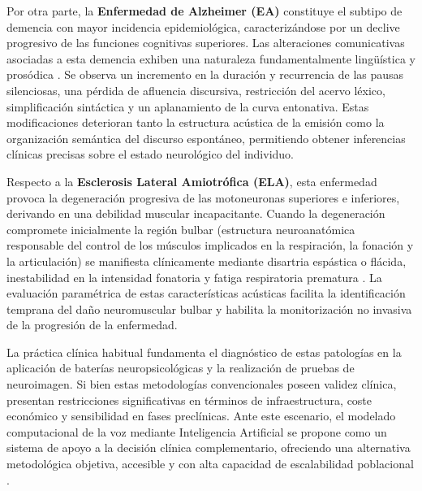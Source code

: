 Por otra parte, la \textbf{Enfermedad de Alzheimer (EA)} constituye el subtipo de demencia con mayor incidencia epidemiológica, caracterizándose por un declive progresivo de las funciones cognitivas superiores. Las alteraciones comunicativas asociadas a esta demencia exhiben una naturaleza fundamentalmente lingüística y prosódica \cite{garcia-gutierrezUnveilingSoundCognitive2024}. Se observa un incremento en la duración y recurrencia de las pausas silenciosas, una pérdida de afluencia discursiva, restricción del acervo léxico, simplificación sintáctica y un aplanamiento de la curva entonativa. Estas modificaciones deterioran tanto la estructura acústica de la emisión como la organización semántica del discurso espontáneo, permitiendo obtener inferencias clínicas precisas sobre el estado neurológico del individuo.

Respecto a la \textbf{Esclerosis Lateral Amiotrófica (ELA)}, esta enfermedad provoca la degeneración progresiva de las motoneuronas superiores e inferiores, derivando en una debilidad muscular incapacitante. Cuando la degeneración compromete inicialmente la región bulbar (estructura neuroanatómica responsable del control de los músculos implicados en la respiración, la fonación y la articulación) se manifiesta clínicamente mediante disartria espástica o flácida, inestabilidad en la intensidad fonatoria y fatiga respiratoria prematura \cite{romero2018}. La evaluación paramétrica de estas características acústicas facilita la identificación temprana del daño neuromuscular bulbar y habilita la monitorización no invasiva de la progresión de la enfermedad.

La práctica clínica habitual fundamenta el diagnóstico de estas patologías en la aplicación de baterías neuropsicológicas y la realización de pruebas de neuroimagen. Si bien estas metodologías convencionales poseen validez clínica, presentan restricciones significativas en términos de infraestructura, coste económico y sensibilidad en fases preclínicas. Ante este escenario, el modelado computacional de la voz mediante Inteligencia Artificial se propone como un sistema de apoyo a la decisión clínica complementario, ofreciendo una alternativa metodológica objetiva, accesible y con alta capacidad de escalabilidad poblacional \cite{moro-velazquezNewToolsDifferential2021}.